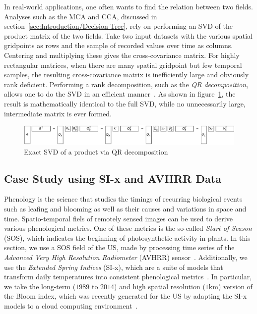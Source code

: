 \documentclass[ijgi,article,submit,moreauthors,pdftex,10pt,a4paper]{Definitions/mdpi}
\begin{document}
In real-world applications, one often wants to find the relation between two fields. Analyses such as the MCA and CCA, discussed in section~\ref{sec:Introduction/Decision Tree}, rely on performing an SVD of the product matrix of the two fields. Take two input datasets with the various spatial gridpoints as rows and the sample of recorded values over time as columns. Centering and multiplying these gives the cross-covariance matrix. For highly rectangular matrices, when there are many spatial gridpoint but few temporal samples, the resulting cross-covariance matrix is inefficiently large and obviously rank deficient. Performing a rank decomposition, such as the \textit{QR decomposition}, allows one to do the SVD in an efficient manner~\cite{Chan1982, Tygert2017}. As shown in figure~\ref{fig:qrProductSVD}, the result is mathematically identical to the full SVD, while no unnecessarily large, intermediate matrix is ever formed.

\begin{figure}[H]
\centering
\includegraphics[width=\textwidth]{Results/qrProductSVD.pdf}
\caption[Exact SVD via QR decomposition]{Exact SVD of a product via QR decomposition}
\label{fig:qrProductSVD}
\end{figure}

\subsection{Case Study using SI-x and AVHRR Data}
\label{sec:Results/Case Study using SI-x and AVHRR Data}

Phenology is the science that studies the timings of recurring biological events such as leafing and blooming as well as their causes and variations in space and time. Spatio-temporal fiels of remotely sensed images can be used to derive various phenological metrics. One of these metrics is the so-called \textit{Start of Season} (SOS), which indicates the beginning of photosynthetic activity in plants. In this section, we use a SOS field of the US, made by processing time series of the \textit{Advanced Very High Resolution Radiometer} (AVHRR) sensor~\cite{Reed1994}. Additionally, we use the \textit{Extended Spring Indices} (SI-x), which are a suite of models that transform daily temperatures into consistent phenological metrics~\cite{Schwartz2013}. In particular, we take the long-term ($1989$ to $2014$) and high spatial resolution ($1$km) version of the Bloom index, which was recently generated for the US by adapting the SI-x models to a cloud computing environment~\cite{Izquierdo2015}.
\end{document}
